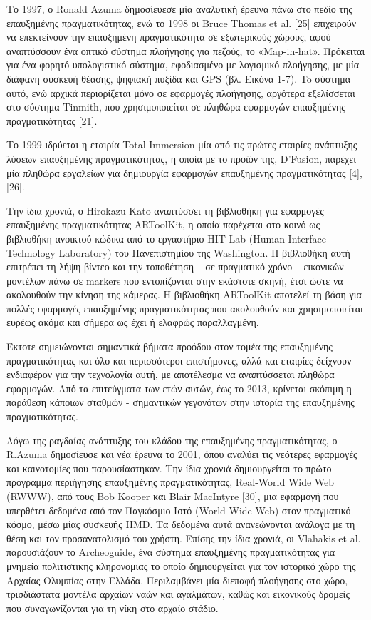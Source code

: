 Το 1997, ο Ronald Azuma δημοσίευεσε μία αναλυτική έρευνα πάνω στο πεδίο της επαυξημένης πραγματικότητας\cite{azuma1997}, ενώ το 1998 οι Bruce Thomas et al. [25] επιχειρούν να επεκτείνουν την επαυξημένη πραγματικότητα σε εξωτερικούς χώρους, αφού αναπτύσσουν ένα οπτικό σύστημα πλοήγησης για πεζούς, το «Map-in-hat». Πρόκειται για ένα φορητό υπολογιστικό σύστημα, εφοδιασμένο με λογισμικό πλοήγησης, με μία διάφανη συσκευή θέασης, ψηφιακή πυξίδα και GPS (βλ. Εικόνα 1-7). To σύστημα αυτό, ενώ αρχικά περιορίζεται μόνο σε εφαρμογές πλοήγησης, αργότερα εξελίσσεται στο σύστημα Tinmith, που χρησιμοποιείται σε πληθώρα εφαρμογών επαυξημένης πραγματικότητας [21].

Το 1999 ιδρύεται η εταιρία Total Immersion μία από τις πρώτες εταιρίες ανάπτυξης λύσεων επαυξημένης πραγματικότητας, η οποία με το προϊόν της, D’Fusion, παρέχει μία πληθώρα εργαλείων για δημιουργία εφαρμογών επαυξημένης πραγματικότητας [4], [26].

Την ίδια χρονιά, ο Hirokazu Kato αναπτύσσει τη βιβλιοθήκη για εφαρμογές επαυξημένης πραγματικότητας ARToolKit, η οποία παρέχεται στο κοινό ως βιβλιοθήκη ανοικτού κώδικα από το εργαστήριο ΗΙΤ Lab (Human Interface Technology Laboratory) του Πανεπιστημίου της Washington. H βιβλιοθήκη αυτή επιτρέπει τη λήψη βίντεο και την τοποθέτηση – σε πραγματικό χρόνο – εικονικών μοντέλων πάνω σε markers που εντοπίζονται στην εκάστοτε σκηνή, έτσι ώστε να ακολουθούν την κίνηση της κάμερας. Η βιβλιοθήκη ARToolKit αποτελεί τη βάση για πολλές εφαρμογές επαυξημένης πραγματικότητας που ακολουθούν και χρησιμοποιείται ευρέως ακόμα και σήμερα ως έχει ή ελαφρώς παραλλαγμένη.



Έκτοτε σημειώνονται σημαντικά βήματα προόδου στον τομέα της επαυξημένης πραγματικότητας και όλο και περισσότεροι επιστήμονες, αλλά και εταιρίες δείχνουν ενδιαφέρον για την τεχνολογία αυτή, με αποτέλεσμα να αναπτύσσεται πληθώρα εφαρμογών. Από τα επιτεύγματα των ετών αυτών, έως το 2013, κρίνεται σκόπιμη η παράθεση κάποιων σταθμών - σημαντικών γεγονότων στην ιστορία της επαυξημένης πραγματικότητας.

Λόγω της ραγδαίας ανάπτυξης του κλάδου της επαυξημένης πραγματικότητας, ο R.Azuma δημοσίευσε και νέα έρευνα το 2001\cite{azuma2001}, όπου αναλύει τις νεότερες εφαρμογές και καινοτομίες που παρουσίαστηκαν.
Την ίδια χρονιά δημιουργείται το πρώτο πρόγραμμα περιήγησης επαυξημένης πραγματικότητας, Real-World Wide Web (RWWW), από τους Bob Kooper και Blair MacIntyre [30], μια εφαρμογή που υπερθέτει δεδομένα από τον Παγκόσμιο Ιστό (World Wide Web) στον πραγματικό κόσμο, μέσω μίας συσκευής HMD. Τα δεδομένα αυτά ανανεώνονται ανάλογα με τη θέση και τον προσανατολισμό του χρήστη.
Επίσης την ίδια χρονιά, οι Vlahakis et al. παρουσιάζουν το Archeoguide, ένα σύστημα επαυξημένης πραγματικότητας για μνημεία πολιτιστικης κληρονομιας 
το οποίο δημιουργείται για τον ιστορικό χώρο της Αρχαίας Ολυμπίας στην Ελλάδα. Περιλαμβάνει μία διεπαφή πλοήγησης στο χώρο, τρισδιάστατα μοντέλα αρχαίων ναών και αγαλμάτων, καθώς και εικονικούς δρομείς που συναγωνίζονται για τη νίκη στο αρχαίο στάδιο.


